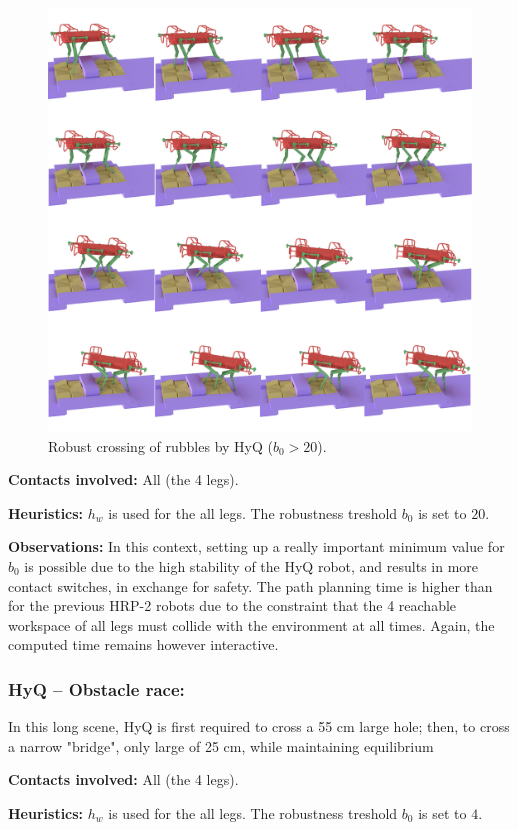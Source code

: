 \begin{figure}
  \centering
  \includegraphics[width=0.5\linewidth]{figures/darpa}
  \caption{
           Robust crossing of rubbles by HyQ ($b_0 > 20$). }
		   \label{fig:darpa}
\end{figure}


\noindent\textbf{Contacts involved:} All (the 4 legs).

\noindent\textbf{Heuristics:} $h_w$ is used for the all legs. The robustness treshold $b_0$ is set to $20$.

\noindent\textbf{Observations:} In this context, setting up a really important minimum value for $b_0$ is possible due to the high
stability of the HyQ robot, and results in more contact switches, in exchange for safety. The path planning time is higher than for the previous HRP-2 robots due to the constraint that the 4 reachable workspace of all legs must
collide with the environment at all times. Again, the computed time remains however interactive.

\subsubsection{HyQ -- Obstacle race:}
In this long scene, HyQ is first required to cross a 55 cm large hole; then, to cross a narrow "bridge", only large of 25 cm,
while maintaining equilibrium



\noindent\textbf{Contacts involved:} All (the 4 legs).

\noindent\textbf{Heuristics:} $h_w$ is used for the all legs. The robustness treshold $b_0$ is set to $4$.

